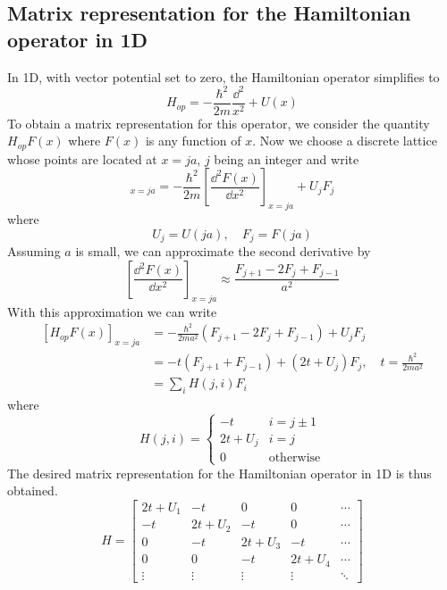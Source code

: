 \documentclass[11pt,a4paper]{book}
\theoremstyle{plain}
\theoremstyle{definition}
\theoremstyle{remark}
\begin{document}
\subsection{Matrix representation for the Hamiltonian operator in 1D}
In 1D, with vector potential set to zero, the Hamiltonian operator simplifies to
\begin{equation}
    H_{op} = -\frac{\hbar^2}{2 m} \frac{\dd^2}{x^2} + U(x)
\end{equation}
To obtain a matrix representation for this operator, we consider the quantity $H_{op}F(x)$ where $F(x)$ is any function of $x$. Now we choose a discrete lattice whose points are located at $x = ja$, $j$ being an integer and write 
\begin{equation}
    [H_{op}F(x)]_{x=ja} = -\frac{\hbar^2}{2 m} \left[ \frac{\dd^2 F(x)}{\dd x^2} \right]_{x=ja} + U_j F_j
\end{equation}
where
\begin{equation}
    U_j = U(ja), \quad F_j = F(ja)
\end{equation}
Assuming $a$ is small, we can approximate the second derivative by
\begin{equation}
    \left[ \frac{\dd^2 F(x)}{\dd x^2} \right]_{x=ja} \approx \frac{F_{j+1} - 2 F_j + F_{j-1}}{a^2}
\end{equation}
With this approximation we can write
\begin{equation}
    \begin{aligned}
        [H_{op}F(x)]_{x=ja} & = -\frac{\hbar^2}{2 m a^2} (F_{j+1} - 2 F_j + F_{j-1}) + U_j F_j \\
        & = -t (F_{j+1} + F_{j-1}) + (2 t + U_j) F_j, \quad t = \frac{\hbar^2}{2 m a^2} \\
        & = \sum_{i} H(j,i) F_i
    \end{aligned}
\end{equation}
where
\begin{equation}
    H(j,i) = \begin{cases}
        -t & i = j \pm 1 \\
        2 t + U_j & i = j \\
        0 & \mbox{otherwise}
    \end{cases}
\end{equation}
The desired matrix representation for the Hamiltonian operator in 1D is thus obtained.
\begin{equation}
    H = 
    \begin{bmatrix}
        2t + U_1 & -t & 0 & 0 & \cdots \\
        -t & 2t + U_2 & -t & 0 & \cdots \\
        0 & -t & 2t + U_3 & -t & \cdots \\
        0 & 0 & -t & 2t + U_4 & \cdots \\
        \vdots & \vdots & \vdots & \vdots & \ddots
    \end{bmatrix}
\end{equation}
\end{document}
